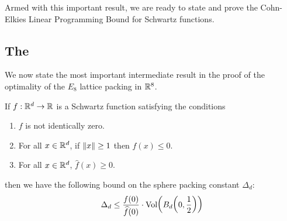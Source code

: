 Armed with this important result, we are ready to state and prove the Cohn-Elkies Linear Programming Bound for Schwartz functions.

\subsection{The \CELP}

We now state the most important intermediate result in the proof of the optimality of the $E_8$ lattice packing in $\mathbb{R}^8$.

\begin{boxtheorem}\label{SP:Thm:CohnElkies} %
    If $f : \mathbb{R}^d \to \mathbb{R}$ is a Schwartz function satisfying the conditions
    \begin{enumerate}[label = \normalfont(CE\arabic*)]
        \item\label{CE1} $f$ is not identically zero.
        \item\label{CE2} For all $x \in \mathbb{R}^d$, if $\left\lVert x \right\rVert \geq 1$ then $f(x) \leq 0$.
        \item\label{CE3} For all $x \in \mathbb{R}^d$, $\hat{f}(x) \geq 0$.
    \end{enumerate}
    then we have the following bound on the sphere packing constant $\Delta_d$:
    \begin{align*}
        \Delta_d \leq \frac{f(0)}{\widehat{f}(0)} \cdot \operatorname{Vol}\!\left( B_d\!\left( 0, \frac{1}{2} \right) \right)
    \end{align*}
\end{boxtheorem}
